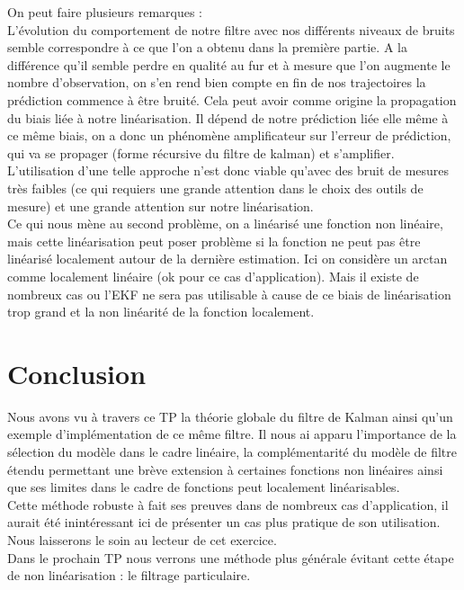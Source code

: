 On peut faire plusieurs remarques :\\
L'évolution du comportement de notre filtre avec nos différents niveaux de bruits semble correspondre à ce que l'on a obtenu dans la première partie. A la différence qu'il semble perdre en qualité au fur et à mesure que l'on augmente le nombre d'observation, on s'en rend bien compte en fin de nos trajectoires la prédiction commence à être bruité. Cela peut avoir comme origine la propagation du biais liée à notre linéarisation. Il dépend de notre prédiction liée elle même à ce même biais, on a donc un phénomène amplificateur sur l'erreur de prédiction, qui va se propager (forme récursive du filtre de kalman) et s'amplifier. L’utilisation d’une telle approche n’est donc viable qu’avec des bruit de mesures très faibles (ce qui requiers une grande attention dans le choix des outils de mesure) et une grande attention sur notre linéarisation.\\
Ce qui nous mène au second problème, on a linéarisé une fonction non linéaire, mais cette linéarisation peut poser problème si la fonction ne peut pas être linéarisé localement autour de la dernière estimation. Ici on considère un arctan comme localement linéaire (ok pour ce cas d'application). Mais il existe de nombreux cas ou l'EKF ne sera pas utilisable à cause de ce biais de linéarisation trop grand et la non linéarité de la fonction localement.


\section{Conclusion}
Nous avons vu à travers ce TP la théorie globale du filtre de Kalman ainsi qu'un exemple d'implémentation de ce même filtre. Il nous ai apparu l'importance de la sélection du modèle dans le cadre linéaire, la complémentarité du modèle de filtre étendu permettant une brève extension à certaines fonctions non linéaires ainsi que ses limites dans le cadre de fonctions peut localement linéarisables.\\
Cette méthode robuste à fait ses preuves dans de nombreux cas d'application, il aurait été inintéressant ici de présenter un cas plus pratique de son utilisation. Nous laisserons le soin au lecteur de cet exercice.\\
Dans le prochain TP nous verrons une méthode plus générale évitant cette étape de non linéarisation : le filtrage particulaire.


















